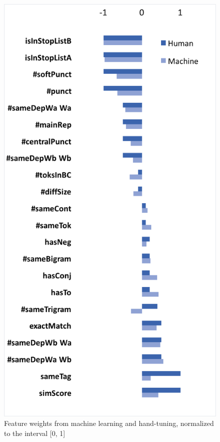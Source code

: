 \documentclass[11pt]{article}
\begin{document}
\begin{center}
\begin{figure}[t]
\includegraphics[scale=0.52]{images/HumMach}
\caption{Feature weights from machine learning and hand-tuning, normalized to the interval [0, 1]}
\label{featscale}
\end{figure}
\end{center}
\end{document}

